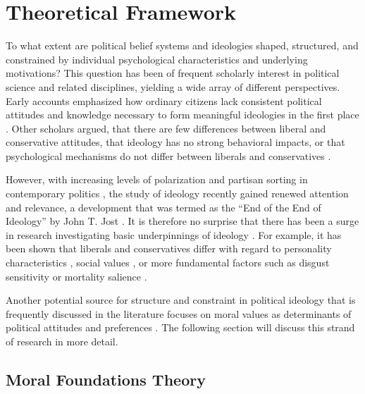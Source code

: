 \documentclass[12pt]{article}
\begin{document}
\section{Theoretical Framework}

To what extent are political belief systems and ideologies shaped, structured, and constrained by individual psychological characteristics and underlying motivations? This question has been of frequent scholarly interest in political science and related disciplines, yielding a wide array of different perspectives. Early accounts emphasized how ordinary citizens lack consistent political attitudes and knowledge necessary to form meaningful ideologies in the first place \citep[e.g.][]{converse1964nature}. Other scholars argued, that there are few differences between liberal and conservative attitudes, that ideology has no strong behavioral impacts, or that psychological mechanisms do not differ between liberals and conservatives \citep[see][for an overview regarding each of these points]{jost2006end}.

However, with increasing levels of polarization and partisan sorting in contemporary politics \citep[e.g.][]{iyengar2015fear}, the study of ideology recently gained renewed attention and relevance, a development that was termed as the ``End of the End of Ideology'' by John T. Jost \citeyearpar{jost2006end}. It is therefore no surprise that there has been a surge in research investigating basic underpinnings of ideology \citep[see also][]{jost2003political,jost2009political}. For example, it has been shown that liberals and conservatives differ with regard to personality characteristics \citep{gerber2010personality,hirsh2010compassionate,de2015personality,feldman2014understanding}, social values \citep{schwartz2010basic,schwartz2011basic,piurko2011basic}, or more fundamental factors such as disgust sensitivity \citep{inbar2009conservatives} or mortality salience \citep{burke2013death}.

Another potential source for structure and constraint in political ideology that is frequently discussed in the literature focuses on moral values as determinants of political attitudes and preferences \citep{lakoff1995metaphor,haidt2008moral,mcadams2008family}. The following section will discuss this strand of research in more detail.


\subsection{Moral Foundations Theory}
\end{document}
